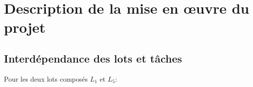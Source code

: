 \documentclass[a4paper]{article}
\begin{document}
\section{Description de la mise en œuvre du projet}
\subsection{Interdépendance des lots et tâches}
Pour les deux lots composés $L_1$ et $L_5$:
\begin{figure}[!ht]
	\centering
	\subfigure[$L_5$] {
}
\end{figure}
\end{document}
